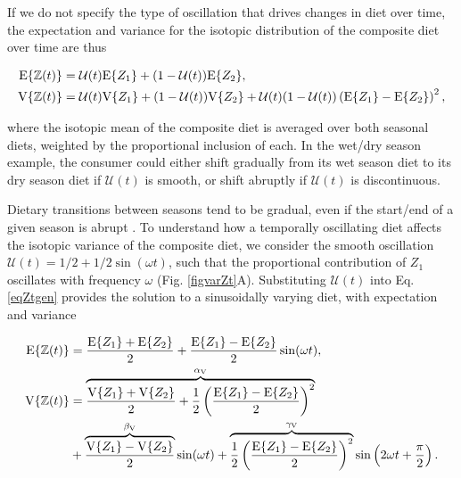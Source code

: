 \documentclass{article}
\begin{document}
If we do not specify the type of oscillation that drives changes in diet over time, the expectation and variance for the isotopic distribution of the composite diet over time are thus

\begin{align}
  \label{eqZtgen}
  \begin{split}
    {\rm E}\{\mathbb{Z}(t)\} &= \mathcal{U}(t){\rm E}\{Z_1\} + (1-\mathcal{U}(t)){\rm E}\{Z_2\}, \\
    {\rm V}\{\mathbb{Z}(t)\} &= \mathcal{U}(t){\rm V}\{Z_1\} + (1-\mathcal{U}(t)){\rm V}\{Z_2\} + \mathcal{U}(t)(1-\mathcal{U}(t))\left({\rm E}\{Z_1\} - {\rm E}\{Z_2\}\right)^2,
  \end{split}
\end{align}

\noindent where the isotopic mean of the composite diet is averaged over both seasonal diets, weighted by the proportional inclusion of each.
In the wet/dry season example, the consumer could either shift gradually from its wet season diet to its dry season diet if $\mathcal{U}(t)$ is smooth, or shift abruptly if $\mathcal{U}(t)$ is discontinuous.


Dietary transitions between seasons tend to be gradual, even if the start/end of a given season is abrupt \citep{Thompson:1995co,CodronSAJWR2007}.
To understand how a temporally oscillating diet affects the isotopic variance of the composite diet, we consider the smooth oscillation $\mathcal{U}(t) = 1/2 + 1/2\sin(\omega t)$, such that the proportional contribution of $Z_1$ oscillates with frequency $\omega$ (Fig. \ref{figvarZt}A).
Substituting $\mathcal{U}(t)$ into Eq. \ref{eqZtgen} provides the solution to a sinusoidally varying diet, with expectation and variance

\begin{align}
  \begin{split}
  \label{eqZtsin}
  	{\rm E}\{\mathbb{Z}(t)\} &= \frac{{\rm E}\{Z_1\} + {\rm E}\{Z_2\}}{2} + \frac{{\rm E}\{Z_1\} - {\rm E}\{Z_2\}}{2}\sin(\omega t), \\
    {\rm V}\{\mathbb{Z}(t)\} &= \overbrace{\frac{{\rm V}\{Z_1\} + {\rm V}\{Z_2\}}{2} + \frac{1}{2} \left(\frac{{\rm E}\{Z_1\} - {\rm E}\{Z_2\}}{2}\right)^2}^{\alpha_{\rm V}} \\
    &+ \overbrace{\frac{{\rm V}\{Z_1\} - {\rm V}\{Z_2\}}{2}}^{\beta_{\rm V}}\sin(\omega t) + \overbrace{\frac{1}{2}\left(\frac{{\rm E}\{Z_1\} - {\rm E}\{Z_2\}}{2}\right)^2}^{\gamma_{\rm V}}\sin\left(2\omega t + \frac{\pi}{2}\right).
  \end{split}
\end{align}
\end{document}
